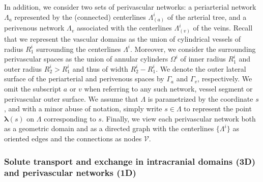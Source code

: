 In addition, we consider two sets of perivascular networks: a
periarterial network $\Lambda_a$ represented by the (connected)
centerlines $\Lambda^i_{(a)}$ of the arterial tree, and a perivenous
network $\Lambda_v$ associated with the centerlines $\Lambda^i_{(v)}$
of the veins. Recall that we represent the vascular domains as the
union of cylindrical vessels of radius $R_1^i$ surrounding the
centerlines $\Lambda^i$. Moreover, we consider the surrounding
perivascular spaces as the union of annular cylinders $\Omega^i$ of
inner radius $R_1^i$ and outer radius $R_2^i > R_1^i$ and thus of
width $R_2^i - R_1^i$. We denote the outer lateral surface of the
periarterial and perivenous spaces by $\Gamma_a$ and $\Gamma_v$,
respectively. We omit the subscript $a$ or $v$ when referring to any
such network, vessel segment or perivascular outer surface. We assume
that $\Lambda$ is parametrized by the coordinate $s$, and with a minor
abuse of notation, simply write $s \in \Lambda$ to represent the point
${\bm \lambda}(s)$ on $\Lambda$ corresponding to $s$. Finally, we view
each perivascular network both as a geometric domain and as a directed
graph with the centerlines $\{ \Lambda^i \}$ as oriented edges and the
connections as nodes $\mathcal{V}$.

\subsubsection{Solute transport and exchange in intracranial domains (3D) and perivascular networks (1D)}
\label{sec:app:transport_eqs}

